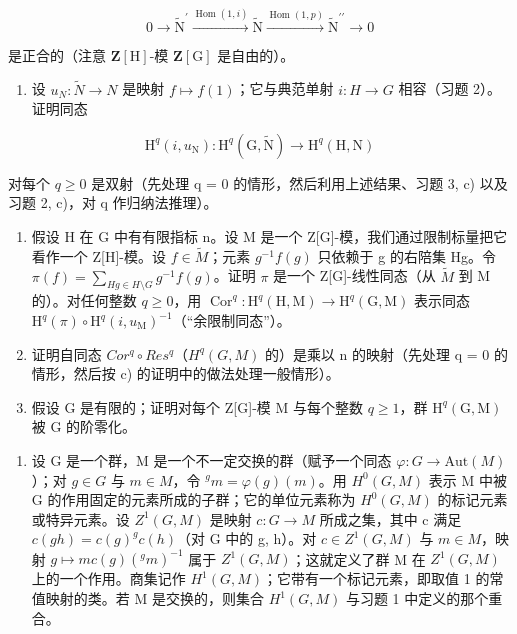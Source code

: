 \[
0 \longrightarrow \widetilde {\mathrm{N}} ^ {\prime} \xrightarrow {\operatorname{Hom} (1 , i)} \widetilde {\mathrm{N}} \xrightarrow {\operatorname{Hom} (1 , p)} \widetilde {\mathrm{N}} ^ {\prime \prime} \longrightarrow 0
\]

是正合的（注意 \(\mathbf{Z}[\mathrm{H}]\)-模 \(\mathbf{Z}[\mathrm{G}]\) 是自由的）。

\begin{enumerate}
\def\labelenumi{\alph{enumi})}
\setcounter{enumi}{2}
\tightlist
\item
  设 \(u_{N} : \widetilde{N} \to N\) 是映射 \(f \mapsto f(1)\)；它与典范单射 \(i : H \to G\) 相容（习题 2）。证明同态
\end{enumerate}

\[
\mathrm{H} ^ {q} (i, u _ {\mathrm{N}}): \mathrm{H} ^ {q} (\mathrm{G}, \widetilde {\mathrm{N}}) \to \mathrm{H} ^ {q} (\mathrm{H}, \mathrm{N})
\]

对每个 \(q \geqslant 0\) 是双射（先处理 q = 0 的情形，然后利用上述结果、习题 3, c) 以及习题 2, c)，对 q 作归纳法推理）。

\begin{enumerate}
\def\labelenumi{\alph{enumi})}
\setcounter{enumi}{3}
\item
  假设 H 在 G 中有有限指标 n。设 M 是一个 Z{[}G{]}-模，我们通过限制标量把它看作一个 Z{[}H{]}-模。设 \(f \in \widetilde{M}\)；元素 \(g^{-1}f(g)\) 只依赖于 g 的右陪集 Hg。令 \(\pi(f) = \sum_{Hg \in H \setminus G} g^{-1}f(g)\)。证明 \(\pi\) 是一个 Z{[}G{]}-线性同态（从 \(\widetilde{M}\) 到 M 的）。对任何整数 \(q \geqslant 0\)，用 \(\operatorname{Cor}^{q}: \mathrm{H}^{q}(\mathrm{H}, \mathrm{M}) \to \mathrm{H}^{q}(\mathrm{G}, \mathrm{M})\) 表示同态 \(\mathrm{H}^{q}(\pi) \circ \mathrm{H}^{q}(i, u_{\mathrm{M}})^{-1}\)（“余限制同态”）。
\item
  证明自同态 \(Cor^{q} \circ Res^{q}\)（\(H^{q}(G, M)\) 的）是乘以 n 的映射（先处理 q = 0 的情形，然后按 c) 的证明中的做法处理一般情形）。
\item
  假设 G 是有限的；证明对每个 Z{[}G{]}-模 M 与每个整数 \(q \geqslant 1\)，群 \(\mathrm{H}^{q}(\mathrm{G}, \mathrm{M})\) 被 G 的阶零化。
\end{enumerate}

\begin{enumerate}
\def\labelenumi{\arabic{enumi})}
\setcounter{enumi}{4}
\tightlist
\item
  设 G 是一个群，M 是一个不一定交换的群（赋予一个同态 \(\varphi: G \to \text{Aut}(M)\)）；对 \(g \in G\) 与 \(m \in M\)，令 \(^{g}m = \varphi(g)(m)\)。用 \(H^{0}(G, M)\) 表示 M 中被 G 的作用固定的元素所成的子群；它的单位元素称为 \(H^{0}(G, M)\) 的标记元素或特异元素。设 \(Z^{1}(G, M)\) 是映射 \(c: G \to M\) 所成之集，其中 c 满足 \(c(gh) = c(g)^{g}c(h)\)（对 G 中的 g, h）。对 \(c \in Z^{1}(G, M)\) 与 \(m \in M\)，映射 \(g \mapsto mc(g)(^g m)^{-1}\) 属于 \(Z^{1}(G, M)\)；这就定义了群 M 在 \(Z^{1}(G, M)\) 上的一个作用。商集记作 \(H^{1}(G, M)\)；它带有一个标记元素，即取值 1 的常值映射的类。若 M 是交换的，则集合 \(H^{1}(G, M)\) 与习题 1 中定义的那个重合。
\end{enumerate}

